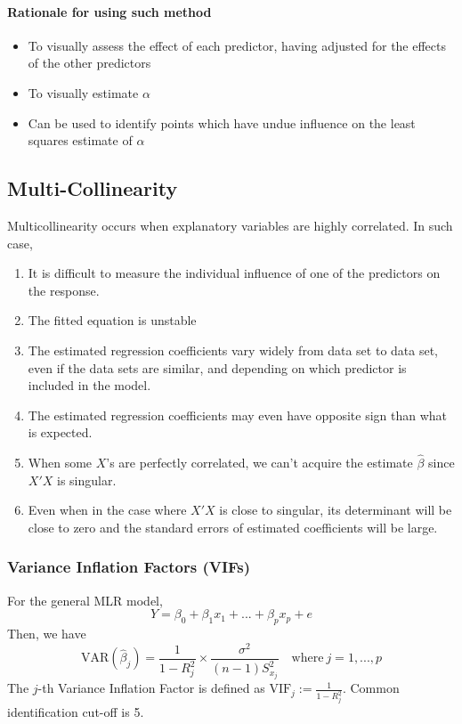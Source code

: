 \documentclass[10pt]{article}
\begin{document}
\paragraph{Rationale for using such method}
\begin{itemize}
    \item To visually assess the effect of each predictor, having adjusted for the effects of the other predictors
    \item To visually estimate $\alpha$
    \item Can be used to identify points which have undue influence on the least squares estimate of $\alpha$
\end{itemize}

\color{BurntOrange}
\subsection{Multi-Collinearity}
\color{Black}
Multicollinearity occurs when explanatory variables are highly correlated. In such case,
\begin{enumerate}
    \item It is difficult to measure the individual influence of one of the predictors on the response. 
    \item The fitted equation is unstable
    \item The estimated regression coefficients vary widely from data set to data set, even if the data sets are similar, and depending on which predictor is included in the model.
    \item The estimated regression coefficients may even have opposite sign than what is expected. 
    \item When some $X$'s are perfectly correlated, we can't acquire the estimate $\hat{\beta}$ since $X'X$ is singular. 
    \item Even when in the case where $X'X$ is close to singular, its determinant will be close to zero and the standard errors of estimated coefficients will be large. 
\end{enumerate}
\subsubsection{Variance Inflation Factors (VIFs)}
For the general MLR model, 
\begin{equation*}
    Y = \beta_0 + \beta_1 x_1 +... + \beta_p x_p + e
\end{equation*}
Then, we have
\begin{equation*}
    \mathrm{VAR}(\hat{\beta}_j) = \frac{1}{1 - R_j^2} \times \frac{\sigma^2}{(n - 1)S_{x_j}^2} \quad \text{where} ~j = 1,...,p
\end{equation*}
The $j$-th Variance Inflation Factor is defined as $\mathrm{VIF}_j := \frac{1}{1 - R_j^2}$. Common identification cut-off is 5. 
\end{document}
